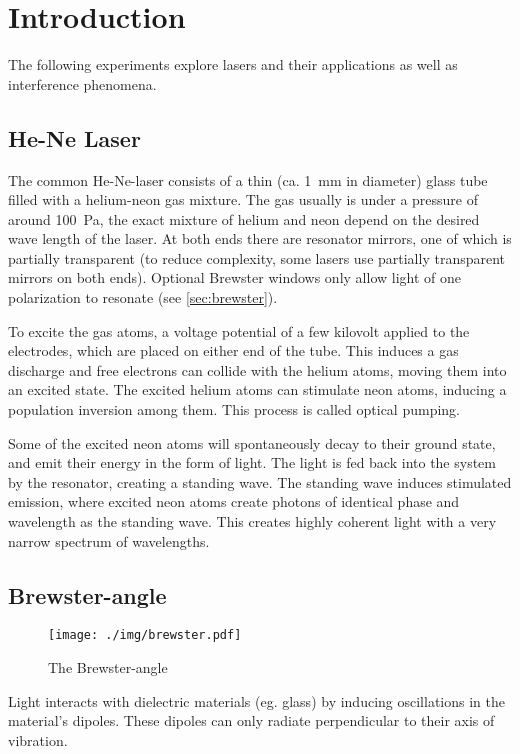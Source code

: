 \chapter{Introduction}
The following experiments explore lasers and their applications as well as interference phenomena.

\section{He-Ne Laser}
The common He-Ne-laser consists of a thin (ca. \SI{1}{\milli\meter} in diameter) glass tube filled with a helium-neon gas mixture.
The gas usually is under a pressure of around \SI{100}{\pascal}, the exact mixture of helium and neon depend on the desired wave length of the laser.
At both ends there are resonator mirrors, one of which is partially transparent (to reduce complexity, some lasers use partially transparent mirrors on both ends).
Optional Brewster windows only allow light of one polarization to resonate (see \autoref{sec:brewster}).

To excite the gas atoms, a voltage potential of a few kilovolt applied to the electrodes, which are placed on either end of the tube.
This induces a gas discharge and free electrons can collide with the helium atoms, moving them into an excited state.
The excited helium atoms can stimulate neon atoms, inducing a population inversion among them.
This process is called optical pumping.

Some of the excited neon atoms will spontaneously decay to their ground state, and emit their energy in the form of light.
The light is fed back into the system by the resonator, creating a standing wave.
The standing wave induces stimulated emission, where excited neon atoms create photons of identical phase and wavelength as the standing wave.
This creates highly coherent light with a very narrow spectrum of wavelengths.

\section{Brewster-angle}\label{sec:brewster}

\begin{figure}[tb]
	\centering
	\texttt{[image: ./img/brewster.pdf]}
	\caption[Brewster-angle]{The Brewster-angle}
\end{figure}

Light interacts with dielectric materials (eg. glass) by inducing oscillations in the material's dipoles.
These dipoles can only radiate perpendicular to their axis of vibration.

